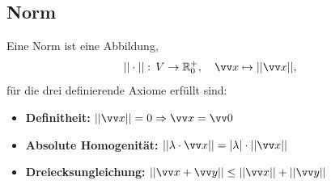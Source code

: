 \subsection{Norm}
Eine Norm ist eine Abbildung, 
\begin{equation}
    ||\cdot||:\, V \to \Real_0^{+}, \quad \ivec{x} \mapsto ||\ivec{x}||, 
\end{equation}
für die drei definierende Axiome erfüllt sind:
\begin{itemize}[itemsep=3pt]
    \item \textbf{Definitheit:} $||\ivec{x}|| = 0 \Rightarrow \ivec{x} = \ivec{0}$
    \item \textbf{Absolute Homogenität:} $||\lambda \cdot \ivec{x}|| = |\lambda| \cdot ||\ivec{x}||$
    \item \textbf{Dreiecksungleichung:} $||\ivec{x}+\ivec{y}|| \le ||\ivec{x}||+||\ivec{y}||$
\end{itemize}


